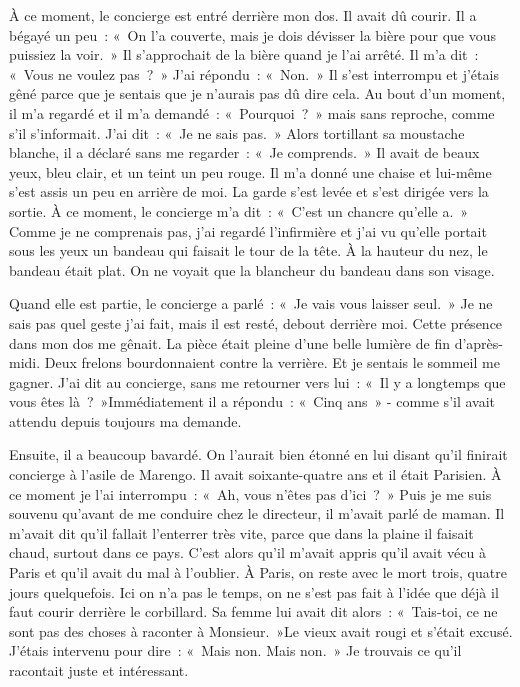 \documentclass[french,twoside]{book} %
\begin{document}
À ce moment, le concierge est entré derrière mon dos. Il avait dû courir. Il a bégayé un peu : « On l’a couverte, mais je dois dévisser la bière pour que vous puissiez la voir. » Il s’approchait de la bière quand je l’ai arrêté. Il m’a dit : « Vous ne voulez pas ? » J'ai répondu : « Non. » Il s’est interrompu et j’étais gêné parce que je sentais que je n’aurais pas dû dire cela. Au bout d’un moment, il m’a regardé et il m’a demandé : « Pourquoi ? » mais sans reproche, comme s’il s’informait. J'ai dit : « Je ne sais pas. » Alors tortillant sa moustache blanche, il a déclaré sans me regarder : « Je comprends. » Il avait de beaux yeux, bleu clair, et un teint un peu rouge. Il m’a donné une chaise et lui-même s’est assis un peu en arrière de moi. La garde s’est levée et s’est dirigée vers la sortie. À ce moment, le concierge m’a dit : « C'est un chancre qu’elle a. » Comme je ne comprenais pas, j’ai regardé l’infirmière et j’ai vu qu’elle portait sous les yeux un bandeau qui faisait le tour de la tête. À la hauteur du nez, le bandeau était plat. On ne voyait que la blancheur du bandeau dans son visage.\par
Quand elle est partie, le concierge a parlé : « Je vais vous laisser seul. » Je ne sais pas quel geste j’ai fait, mais il est resté, debout derrière moi. Cette présence dans mon dos me gênait. La pièce était pleine d’une belle lumière de fin d’après-midi. Deux frelons bourdonnaient contre la verrière. Et je sentais le sommeil me gagner. J'ai dit au concierge, sans me retourner vers lui : « Il y a longtemps que vous êtes là ? »Immédiatement il a répondu : « Cinq ans » - comme s’il avait attendu depuis toujours ma demande.\par
Ensuite, il a beaucoup bavardé. On l’aurait bien étonné en lui disant qu’il finirait concierge à l’asile de Marengo. Il avait soixante-quatre ans et il était Parisien. À ce moment je l’ai interrompu : « Ah, vous n’êtes pas d’ici ? » Puis je me suis souvenu qu’avant de me conduire chez le directeur, il m’avait parlé de maman. Il m’avait dit qu’il fallait l’enterrer très vite, parce que dans la plaine il faisait chaud, surtout dans ce pays. C'est alors qu’il m’avait appris qu’il avait vécu à Paris et qu’il avait du mal à l’oublier. À Paris, on reste avec le mort trois, quatre jours quelquefois. Ici on n’a pas le temps, on ne s’est pas fait à l’idée que déjà il faut courir derrière le corbillard. Sa femme lui avait dit alors : « Tais-toi, ce ne sont pas des choses à raconter à Monsieur. »Le vieux avait rougi et s’était excusé. J'étais intervenu pour dire : « Mais non. Mais non. » Je trouvais ce qu’il racontait juste et intéressant.\par
\end{document}
